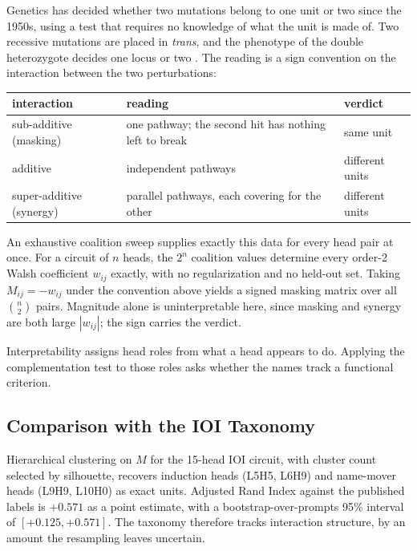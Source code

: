 \documentclass{article}
\begin{document}
Genetics has decided whether two mutations belong to one unit or two since the 1950s, using
a test that requires no knowledge of what the unit is made of. Two recessive mutations are
placed in \emph{trans}, and the phenotype of the double heterozygote decides one locus or
two \citep{benzer1955}. The reading is a sign convention on the interaction between the two
perturbations:

\begin{center}
\begin{tabular}{lll}
\toprule
interaction & reading & verdict \\
\midrule
sub-additive (masking) & one pathway; the second hit has nothing left to break & same unit \\
additive & independent pathways & different units \\
super-additive (synergy) & parallel pathways, each covering for the other & different units \\
\bottomrule
\end{tabular}
\end{center}

An exhaustive coalition sweep supplies exactly this data for every head pair at once. For a
circuit of $n$ heads, the $2^n$ coalition values determine every order-2 Walsh coefficient
$w_{ij}$ exactly, with no regularization and no held-out set. Taking $M_{ij} = -w_{ij}$
under the convention above yields a signed masking matrix over all $\binom{n}{2}$ pairs.
Magnitude alone is uninterpretable here, since masking and synergy are both large
$|w_{ij}|$; the sign carries the verdict.

Interpretability assigns head roles from what a head appears to do. Applying the
complementation test to those roles asks whether the names track a functional criterion.

\subsection{Comparison with the IOI Taxonomy}

Hierarchical clustering on $M$ for the 15-head IOI circuit, with cluster count selected by
silhouette, recovers induction heads (L5H5, L6H9) and name-mover heads (L9H9, L10H0) as
exact units. Adjusted Rand Index against the published labels is $+0.571$ as a point
estimate, with a bootstrap-over-prompts 95\% interval of $[+0.125, +0.571]$. The taxonomy
therefore tracks interaction structure, by an amount the resampling leaves uncertain.
\end{document}

